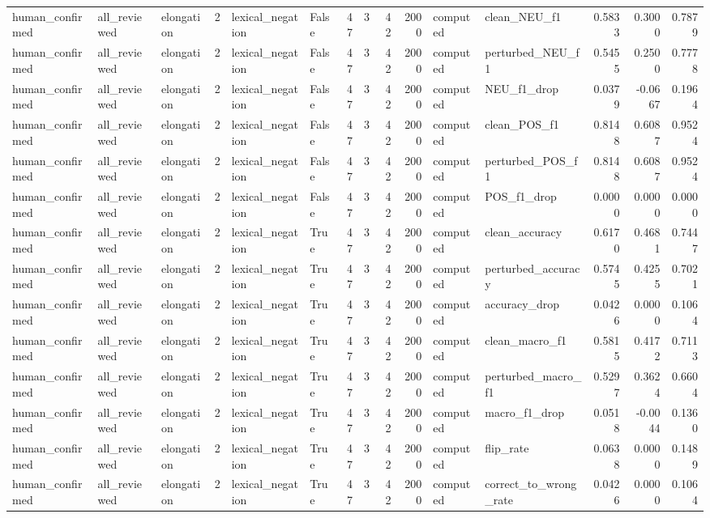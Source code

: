 \begin{tabular}{lllrllrrrrllrrr}
human_confirmed & all_reviewed & elongation & 2 & lexical_negation & False & 47 & 3 & 42 & 2000 & computed & clean_NEU_f1 & 0.5833 & 0.3000 & 0.7879 \\
human_confirmed & all_reviewed & elongation & 2 & lexical_negation & False & 47 & 3 & 42 & 2000 & computed & perturbed_NEU_f1 & 0.5455 & 0.2500 & 0.7778 \\
human_confirmed & all_reviewed & elongation & 2 & lexical_negation & False & 47 & 3 & 42 & 2000 & computed & NEU_f1_drop & 0.0379 & -0.0667 & 0.1964 \\
human_confirmed & all_reviewed & elongation & 2 & lexical_negation & False & 47 & 3 & 42 & 2000 & computed & clean_POS_f1 & 0.8148 & 0.6087 & 0.9524 \\
human_confirmed & all_reviewed & elongation & 2 & lexical_negation & False & 47 & 3 & 42 & 2000 & computed & perturbed_POS_f1 & 0.8148 & 0.6087 & 0.9524 \\
human_confirmed & all_reviewed & elongation & 2 & lexical_negation & False & 47 & 3 & 42 & 2000 & computed & POS_f1_drop & 0.0000 & 0.0000 & 0.0000 \\
human_confirmed & all_reviewed & elongation & 2 & lexical_negation & True & 47 & 3 & 42 & 2000 & computed & clean_accuracy & 0.6170 & 0.4681 & 0.7447 \\
human_confirmed & all_reviewed & elongation & 2 & lexical_negation & True & 47 & 3 & 42 & 2000 & computed & perturbed_accuracy & 0.5745 & 0.4255 & 0.7021 \\
human_confirmed & all_reviewed & elongation & 2 & lexical_negation & True & 47 & 3 & 42 & 2000 & computed & accuracy_drop & 0.0426 & 0.0000 & 0.1064 \\
human_confirmed & all_reviewed & elongation & 2 & lexical_negation & True & 47 & 3 & 42 & 2000 & computed & clean_macro_f1 & 0.5815 & 0.4172 & 0.7113 \\
human_confirmed & all_reviewed & elongation & 2 & lexical_negation & True & 47 & 3 & 42 & 2000 & computed & perturbed_macro_f1 & 0.5297 & 0.3624 & 0.6604 \\
human_confirmed & all_reviewed & elongation & 2 & lexical_negation & True & 47 & 3 & 42 & 2000 & computed & macro_f1_drop & 0.0518 & -0.0044 & 0.1360 \\
human_confirmed & all_reviewed & elongation & 2 & lexical_negation & True & 47 & 3 & 42 & 2000 & computed & flip_rate & 0.0638 & 0.0000 & 0.1489 \\
human_confirmed & all_reviewed & elongation & 2 & lexical_negation & True & 47 & 3 & 42 & 2000 & computed & correct_to_wrong_rate & 0.0426 & 0.0000 & 0.1064 \\

\end{tabular}
